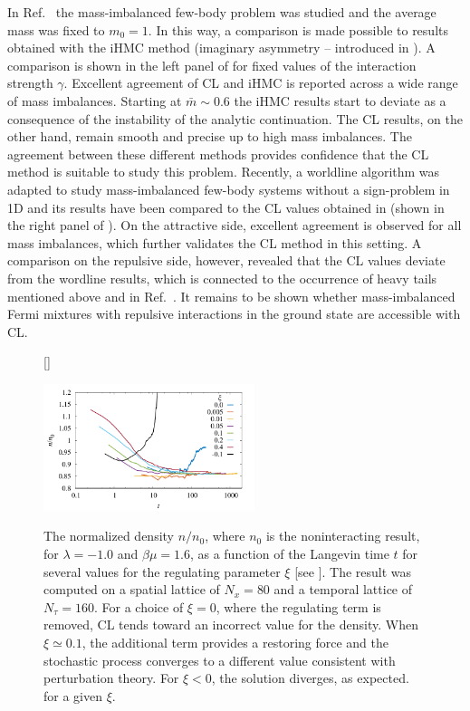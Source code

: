 \documentclass[../main.tex]{subfiles}
\begin{document}
In Ref.~\cite{PRD96094506} the mass-imbalanced few-body problem was studied and the average mass was fixed to $m_0 = 1$. In this way, a comparison is made possible to results obtained with the iHMC method (imaginary asymmetry -- introduced in ). A comparison is shown in the left panel of  for fixed values of the interaction strength $\gamma$. Excellent agreement of CL and iHMC is reported across a wide range of mass imbalances. Starting at $\bar{m} \sim 0.6$ the iHMC results start to deviate as a consequence of the instability of the analytic continuation. The CL results, on the other hand, remain smooth and precise up to high mass imbalances. The agreement between these different methods provides confidence that the CL method is suitable to study this problem.
Recently, a worldline algorithm was adapted to study mass-imbalanced few-body systems without a sign-problem \cite{PhysRevD.99.074511, Singh:2018pci} in 1D and its results have been compared to the CL values obtained in \cite{PRD96094506} (shown in the right panel of ). On the attractive side, excellent agreement is observed for all mass imbalances, which further validates the CL method in this setting. A comparison on the repulsive side, however, revealed that the CL values deviate from the wordline results, which is connected to the occurrence of heavy tails mentioned above and in Ref.~\cite{PRD96094506}. It remains to be shown whether mass-imbalanced Fermi mixtures with repulsive interactions in the ground state are accessible with CL.
%
\begin{figure}[t]
[\FBwidth]
{\caption{\label{fig:XiComparison}The normalized density $n/n_0$, where $n_0$ is the noninteracting result,
	for $\lambda=-1.0$ and $\beta\mu = 1.6$, as a function of the Langevin time $t$ for
	several values for the regulating parameter $\xi$ [see ]. The result was computed on a spatial lattice of $N_x = 80$
  and a temporal lattice of $N_\tau = 160$.
	For a choice of $\xi = 0$, where the regulating term is removed, CL tends toward an incorrect value for the density. When $\xi \simeq 0.1$,
	the additional term provides a restoring force and the stochastic process converges to a different value consistent with perturbation theory.
	For $\xi < 0$, the solution diverges, as expected.
  for a given $\xi$.}}
{\includegraphics[width=0.55\textwidth]{./5applications-NREL/XiExploration.pdf}}
\end{figure}
%
\end{document}
